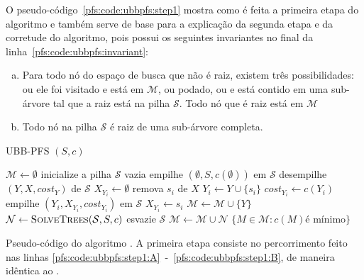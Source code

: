 O pseudo-código~\ref{pfs:code:ubbpfs:step1} mostra como é feita a 
primeira etapa do algoritmo e também serve de base para a explicação da
segunda etapa  e da corretude do algoritmo, pois 
possui os seguintes invariantes no final da linha~\ref{pfs:code:ubbpfs:invariant}:
\begin{enumerate}[a)]
    \item{Para todo nó do espaço de busca que não é raiz, existem três 
        possibilidades: ou ele foi visitado e está em $\mathcal{M}$, ou 
        podado, ou e está contido em uma sub-árvore tal que a raiz está 
        na pilha $\mathcal{S}$. Todo nó que é raiz está em 
        $\mathcal{M}$} \label{pfs:code:ubb:invariant:A}
    \item{Todo nó na pilha $\mathcal{S}$ é raiz de uma sub-árvore 
        completa.} \label{pfs:code:ubb:invariant:B}
\end{enumerate}

\begin{algorithm}[!ht]
\textsc{UBB-PFS} $(S, c)$
\begin{algorithmic}[1]
    \State $\mathcal{M} \gets \emptyset$
    \State inicialize a pilha $\mathcal{S}$ vazia
    \State empilhe $(\emptyset, S, c(\emptyset))$ em $\mathcal{S}$
     \label{pfs:code:ubbpfs:step1:A}
        \State desempilhe $(Y, X, cost_Y)$ de $\mathcal{S}$
        \State $X_{Y_i} \gets \emptyset$
            \State remova $s_i$ de $X$
            \State $Y_i \gets Y \cup \{s_i\}$
            \State $cost_{Y_i} \gets c (Y_i)$
                \State empilhe $(Y_i, X_{Y_i}, cost_{Y_i})$ em $\mathcal{S}$
            \EndIf
            \State $X_{Y_i} \gets {s_i}$
        \EndWhile
        \State $\mathcal{M} \gets \mathcal{M} \cup \{Y\}$ \label{pfs:code:ubbpfs:invariant}
            \State $\mathcal{N} \gets {\normalfont\textsc{SolveTrees}} (\mathcal{S}, S, c)$
            \State esvazie $\mathcal{S}$
        \EndIf
    \EndWhile \label{pfs:code:ubbpfs:step1:B}
    \State $\mathcal{M} \gets \mathcal{M} \cup \mathcal{N}$
    \Return $\{M \in \mathcal{M} : c(M) \text{é mínimo}\}$
\end{algorithmic}
\caption{Pseudo-código do algoritmo . A primeira etapa 
consiste no percorrimento feito nas linhas 
\ref{pfs:code:ubbpfs:step1:A}~-~\ref{pfs:code:ubbpfs:step1:B}, de 
maneira idêntica ao .}
\label{pfs:code:ubbpfs:step1}
\end{algorithm}


